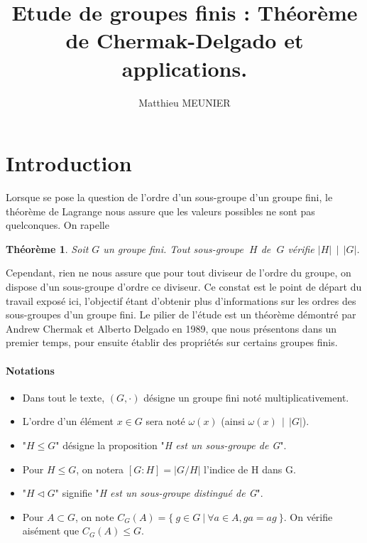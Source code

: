 \documentclass[10pt,a4paper]{article}
\author{Matthieu MEUNIER}
\title{Etude de groupes finis : Théorème de Chermak-Delgado et applications.}
\date{}
\newtheorem{theorem}{Théorème}
\begin{document}
\maketitle
\newpage
{}
\tableofcontents


\section{Introduction}

Lorsque se pose la question de l'ordre d'un sous-groupe d'un groupe fini, le théorème de Lagrange nous assure que les valeurs possibles ne sont pas quelconques. On rapelle 
\begin{theorem}

Soit $G$ un groupe fini. Tout sous-groupe $\:H$ de $\:G$ vérifie $|H| \: \: | \: \: |G|$.

\end{theorem}

Cependant, rien ne nous assure que pour tout diviseur de l'ordre du groupe, on dispose d'un sous-groupe d'ordre ce diviseur. Ce constat est le point de départ du travail exposé ici, l'objectif étant d'obtenir plus d'informations sur les ordres des sous-groupes d'un groupe fini. Le pilier de l'étude est un théorème démontré par Andrew Chermak et Alberto Delgado en 1989, que nous présentons dans un premier temps, pour ensuite établir des propriétés sur certains groupes finis.

\paragraph{Notations}
\smallbreak
\renewcommand{\labelitemi}{$\bullet$}
\begin{itemize}


\item Dans tout le texte, $(G,\cdot)$ désigne un groupe fini noté multiplicativement.
\item L'ordre d'un élément $x \in G$ sera noté $\omega (x)$ (ainsi $\omega (x) \: \: | \:\: |G|$).
\item "$H \leq G$" désigne la proposition "\textit{H est un sous-groupe de G}".
\item Pour $H \leq G$, on notera $[G:H]=|G/H|$ l'indice de H dans G.
\item "$H \triangleleft G$" signifie "\textit{H est un sous-groupe distingué de G}".
\item Pour $A \subset G$, on note $C_{G}(A)=\{\: g \in G \: | \: \forall a \in A, ga=ag \: \}$. On vérifie aisément que $C_{G}(A) \leq G$.
\end{itemize}
\end{document}

